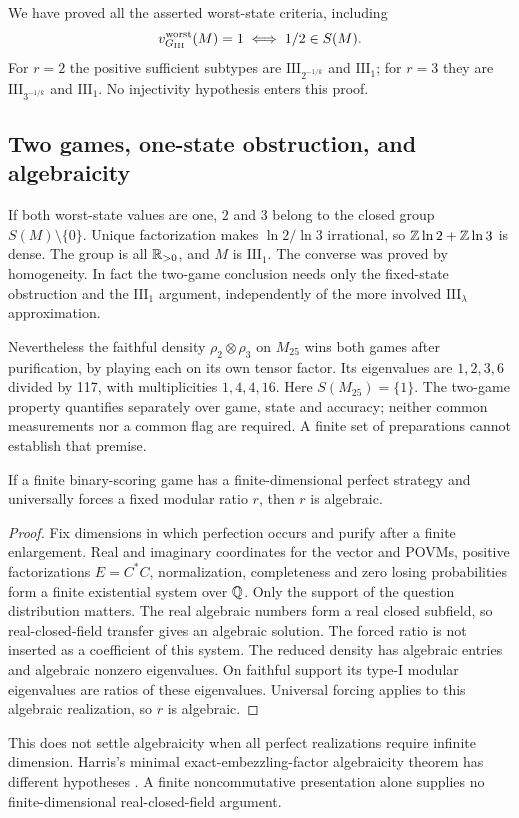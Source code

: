 We have proved all the asserted worst-state criteria, including
\[
 v^{\mathrm{worst}}_{G_{\mathrm{III}}}(M)=1\iff 1/2\in S(M).
\]
For $r=2$ the positive sufficient subtypes are $\mathrm{III}_{2^{-1/k}}$ and $\mathrm{III}_1$; for $r=3$ they are $\mathrm{III}_{3^{-1/k}}$ and $\mathrm{III}_1$. No injectivity hypothesis enters this proof.

\subsection{Two games, one-state obstruction, and algebraicity}
If both worst-state values are one, $2$ and $3$ belong to the closed group $S(M)\setminus\{0\}$. Unique factorization makes $\ln2/\ln3$ irrational, so $\mathbb Z\ln2+\mathbb Z\ln3$ is dense. The group is all $\mathbb R_{>0}$, and $M$ is $\mathrm{III}_1$. The converse was proved by homogeneity. In fact the two-game conclusion needs only the fixed-state obstruction and the $\mathrm{III}_1$ argument, independently of the more involved $\mathrm{III}_\lambda$ approximation.

Nevertheless the faithful density $\rho_2\otimes\rho_3$ on $M_{25}$ wins both games after purification, by playing each on its own tensor factor. Its eigenvalues are $1,2,3,6$ divided by 117, with multiplicities $1,4,4,16$. Here $S(M_{25})=\{1\}$. The two-game property quantifies separately over game, state and accuracy; neither common measurements nor a common flag are required. A finite set of preparations cannot establish that premise.

\begin{proposition}\label{prop:alg}
If a finite binary-scoring game has a finite-dimensional perfect strategy and universally forces a fixed modular ratio $r$, then $r$ is algebraic.
\end{proposition}
\begin{proof}
Fix dimensions in which perfection occurs and purify after a finite enlargement. Real and imaginary coordinates for the vector and POVMs, positive factorizations $E=C^*C$, normalization, completeness and zero losing probabilities form a finite existential system over $\mathbb Q$. Only the support of the question distribution matters. The real algebraic numbers form a real closed subfield, so real-closed-field transfer gives an algebraic solution. The forced ratio is not inserted as a coefficient of this system. The reduced density has algebraic entries and algebraic nonzero eigenvalues. On faithful support its type-I modular eigenvalues are ratios of these eigenvalues. Universal forcing applies to this algebraic realization, so $r$ is algebraic.
\end{proof}
This does not settle algebraicity when all perfect realizations require infinite dimension. Harris's minimal exact-embezzling-factor algebraicity theorem has different hypotheses \cite{Harris}. A finite noncommutative presentation alone supplies no finite-dimensional real-closed-field argument.
